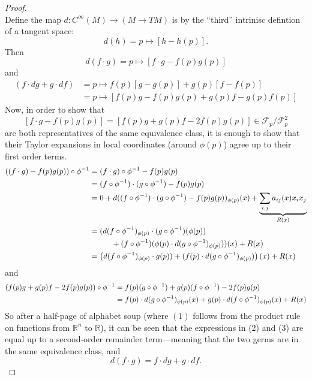 \documentclass{article}
\begin{document}
\begin{proof} \text{} \\
  Define the map $d\colon C^\infty(M) \rightarrow (M \rightarrow TM)$ is
  by the ``third'' intrinisc defintion of a tangent space: \[
    d(h) = p \mapsto [h - h(p)].
  \] Then \[
    d(f \cdot g) = p \mapsto [f \cdot g - f(p)g(p)]
  \] and \begin{align*}
    (f \cdot dg + g \cdot df)
      &= p \mapsto f(p)[g - g(p)] + g(p)[f - f(p)] \\
      &= p \mapsto [f(p)g - f(p)g(p) + g(p)f - g(p)f(p)]
  \end{align*}
  Now, in order to show that \[
    [f \cdot g - f(p)g(p)]
    = [f(p)g + g(p)f - 2f(p)g(p)]
    \in \mathcal{F}_p/\mathcal{F}_p^2
  \]
  are both representatives of the same equivalence class, it is enough to show
  that their Taylor expansions in local coordinates (around $\phi(p)$) agree up
  to their first order terms.
  \begin{align}
    ((f \cdot g) - f(p)g(p)) \circ \phi^{-1}
      &= (f \cdot g) \circ \phi^{-1} - f(p)g(p) \notag \\
      &= (f \circ \phi^{-1}) \cdot (g \circ \phi^{-1}) - f(p)g(p) \notag \\
      &= 0
        + d((f \circ \phi^{-1}) \cdot (g \circ \phi^{-1}) - f(p)g(p))_{\phi(p)}(x)
        + \underbrace{\sum_{i,j} a_{ij}(x) x_i x_j}_{R(x)} \notag \\
      &= (
        d(f \circ \phi^{-1})_{\phi(p)} \cdot (g \circ \phi^{-1})(\phi(p)) \notag \\
        &\hspace{1cm} + (f \circ \phi^{-1})(\phi(p) \cdot d(g \circ \phi^{-1})_{\phi(p)})
      )(x) + R(x) \\
      &= \left(
        d(f \circ \phi^{-1})_{\phi(p)} \cdot g(p))
        + (f(p) \cdot d(g \circ \phi^{-1})_{\phi(p)})
      \right)(x) + R(x)
  \end{align} and
  \begin{align}
    (f(p)g + g(p)f - 2f(p)g(p)) \circ \phi^{-1}
      &= f(p)(g \circ \phi^{-1}) + g(p)(f \circ \phi^{-1}) - 2f(p)g(p) \notag \\
      &= f(p)\cdot d(g \circ \phi^{-1})_{\phi(p)}(x)
        + g(p)\cdot d(f \circ \phi^{-1})_{\phi(p)}(x)
        + R(x)
  \end{align}
  So after a half-page of alphabet soup (where $(1)$ follows from the product rule on
  functions from $\mathbb{R}^n$ to $\mathbb{R}$), it can be seen that the
  expressions in (2) and (3) are equal up to a second-order remainder
  term---meaning that the two germs are in the same equivalence class, and \[
    d(f \cdot g) = f \cdot dg + g \cdot df.
  \]
\end{proof}
\end{document}

